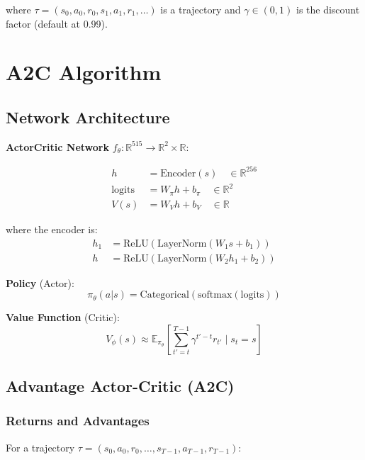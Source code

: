 \documentclass[11pt]{article}
\begin{document}
where $\tau = (s_0, a_0, r_0, s_1, a_1, r_1, \ldots)$ is a trajectory and $\gamma \in (0,1)$ is the discount factor (default at 0.99).

\section{A2C Algorithm}

\subsection{Network Architecture}

\textbf{ActorCritic Network} $f_\theta: \mathbb{R}^{515} \to \mathbb{R}^2 \times \mathbb{R}$:

\begin{align}
h &= \text{Encoder}(s) \quad \in \mathbb{R}^{256} \\
\text{logits} &= W_\pi h + b_\pi \quad \in \mathbb{R}^2 \\
V(s) &= W_V h + b_V \quad \in \mathbb{R}
\end{align}

where the encoder is:
\begin{align}
h_1 &= \text{ReLU}(\text{LayerNorm}(W_1 s + b_1)) \\
h &= \text{ReLU}(\text{LayerNorm}(W_2 h_1 + b_2))
\end{align}

\textbf{Policy} (Actor):
\begin{equation}
\pi_\theta(a|s) = \text{Categorical}(\text{softmax}(\text{logits}))
\end{equation}

\textbf{Value Function} (Critic):
\begin{equation}
V_\phi(s) \approx \mathbb{E}_{\pi_\theta} \left[ \sum_{t'=t}^{T-1} \gamma^{t'-t} r_{t'} \mid s_t = s \right]
\end{equation}

\subsection{Advantage Actor-Critic (A2C)}

\subsubsection{Returns and Advantages}

For a trajectory $\tau = (s_0, a_0, r_0, \ldots, s_{T-1}, a_{T-1}, r_{T-1})$:
\end{document}
